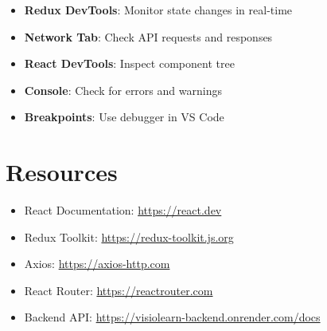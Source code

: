\documentclass[12pt,a4paper,oneside]{article}
\begin{document}
\begin{itemize}
    \item \textbf{Redux DevTools}: Monitor state changes in real-time
    \item \textbf{Network Tab}: Check API requests and responses
    \item \textbf{React DevTools}: Inspect component tree
    \item \textbf{Console}: Check for errors and warnings
    \item \textbf{Breakpoints}: Use debugger in VS Code
\end{itemize}

\section{Resources}

\begin{itemize}
    \item React Documentation: \url{https://react.dev}
    \item Redux Toolkit: \url{https://redux-toolkit.js.org}
    \item Axios: \url{https://axios-http.com}
    \item React Router: \url{https://reactrouter.com}
    \item Backend API: \url{https://visiolearn-backend.onrender.com/docs}
\end{itemize}
\end{document}
